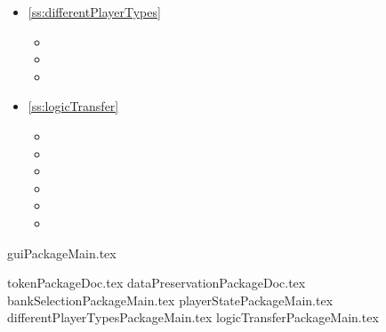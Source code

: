 \begin{multicols}{2}
\begin{itemize}
\begin{minipage}{\linewidth}
\begin{itemize}
		\item {}		
		\item {}	
	\end{itemize}
	\end{minipage}
	\item \ref{ss:differentPlayerTypes} 
	\begin{itemize}
		\item {}
		\item {}
		\item {}
	\end{itemize}
	\item \ref{ss:logicTransfer} 
	\begin{itemize}
		\item {}
		\item {}
		\item {}		
		\item {}
		\item {}		
		\item {}
	\end{itemize}
\end{itemize}
\end{multicols}

\newpage
{guiPackageMain.tex}
\newpage

{tokenPackageDoc.tex}
\newpage
{dataPreservationPackageDoc.tex}
\newpage
{bankSelectionPackageMain.tex}
\newpage
{playerStatePackageMain.tex}
\newpage
{differentPlayerTypesPackageMain.tex}
\newpage
{logicTransferPackageMain.tex}

